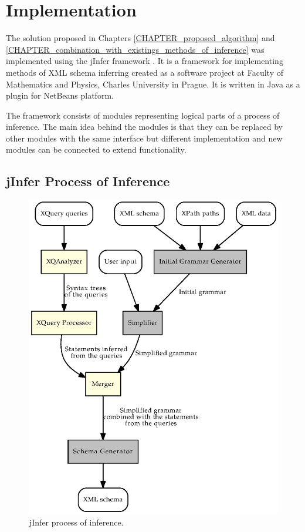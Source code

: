 \chapter{Implementation}
The solution proposed in Chapters \ref{CHAPTER_proposed_algorithm} and \ref{CHAPTER_combination_with_existings_methods_of_inference} was implemented using the jInfer framework \cite{jinfer}. It is a framework for implementing methods of XML schema inferring created as a software project at Faculty of Mathematics and Physics, Charles University in Prague. It is written in Java as a plugin for NetBeans platform.

The framework consists of modules representing logical parts of a process of inference. The main idea behind the modules is that they can be replaced by other modules with the same interface but different implementation and new modules can be connected to extend functionality.

\section{jInfer Process of Inference}
\begin{figure}
\label{FIG_jinfer_steps}
\caption{jInfer process of inference.}
\includegraphics[scale=0.9]{jinfer_steps.eps}
\end{figure}

